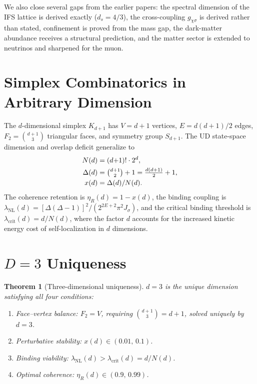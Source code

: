 \documentclass[11pt,twocolumn]{article}
\newtheorem{theorem}{Theorem}
\begin{document}
We also close several gaps from the earlier papers: the spectral dimension of the IFS lattice is derived exactly ($d_s=4/3$), the cross-coupling $g_{\chi\sigma}$ is derived rather than stated, confinement is proved from the mass gap, the dark-matter abundance receives a structural prediction, and the matter sector is extended to neutrinos and sharpened for the muon.

\section{Simplex Combinatorics in Arbitrary Dimension}
\label{sec:simplex}

The $d$-dimensional simplex $K_{d+1}$ has $V=d{+}1$ vertices, $E=d(d{+}1)/2$ edges, $F_2=\binom{d+1}{3}$ triangular faces, and symmetry group $S_{d+1}$.
The UD state-space dimension and overlap deficit generalize to~\cite{hutchinson1981}
\begin{align}
N(d) &= (d{+}1)!\cdot 2^d, \label{eq:Nd}\\
\Delta(d) &= \tbinom{d{+}1}{2}+1 = \tfrac{d(d{+}1)}{2}+1, \label{eq:Dd}\\
x(d) &= \Delta(d)/N(d). \label{eq:xd}
\end{align}
The coherence retention is $\eta_R(d)=1-x(d)$, the binding coupling is $\lambda_{\mathrm{NL}}(d)=[\Delta(\Delta{-}1)]^2/(2^{2E+2}\pi^2 J_\sigma)$, and the critical binding threshold is $\lambda_{\mathrm{crit}}(d)=d/N(d)$, where the factor $d$ accounts for the increased kinetic energy cost of self-localization in $d$ dimensions.

\section{$D=3$ Uniqueness}
\label{sec:d3}

\begin{theorem}[Three-dimensional uniqueness]
\label{thm:d3}
$d=3$ is the unique dimension satisfying all four conditions:
\begin{enumerate}[label=\textnormal{(\roman*)},leftmargin=2em,itemsep=2pt]
\item Face--vertex balance: $F_2=V$, requiring $\binom{d+1}{3}=d+1$, solved uniquely by $d=3$.
\item Perturbative stability: $x(d)\in(0.01,\,0.1)$.
\item Binding viability: $\lambda_{\mathrm{NL}}(d)>\lambda_{\mathrm{crit}}(d)=d/N(d)$.
\item Optimal coherence: $\eta_R(d)\in(0.9,\,0.99)$.
\end{enumerate}
\end{theorem}
\end{document}
